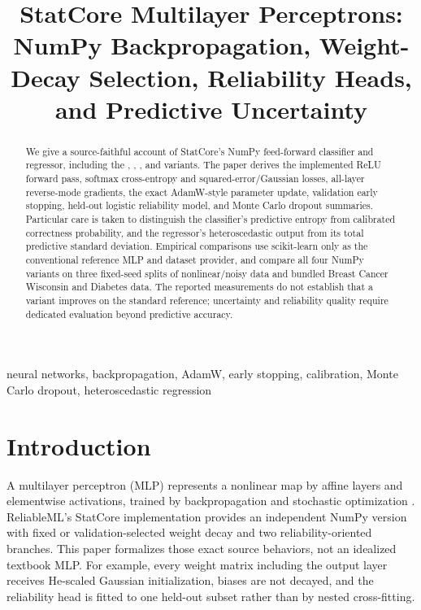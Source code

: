 \documentclass[conference]{IEEEtran}
\title{StatCore Multilayer Perceptrons: NumPy Backpropagation, Weight-Decay Selection, Reliability Heads, and Predictive Uncertainty}
\author{\jabulaniauthor \and \martinchanzauthor \and \oloratoauthor \and \mfundoauthor}
\begin{document}
\maketitle

\begin{abstract}
We give a source-faithful account of StatCore's NumPy feed-forward classifier and regressor, including the , , , and  variants. The paper derives the implemented ReLU forward pass, softmax cross-entropy and squared-error/Gaussian losses, all-layer reverse-mode gradients, the exact AdamW-style parameter update, validation early stopping, held-out logistic reliability model, and Monte Carlo dropout summaries. Particular care is taken to distinguish the classifier's predictive entropy from calibrated correctness probability, and the regressor's heteroscedastic output from its total predictive standard deviation. Empirical comparisons use scikit-learn only as the conventional reference MLP and dataset provider, and compare all four NumPy variants on three fixed-seed splits of nonlinear/noisy data and bundled Breast Cancer Wisconsin and Diabetes data. The reported measurements do not establish that a variant improves on the standard reference; uncertainty and reliability quality require dedicated evaluation beyond predictive accuracy.
\end{abstract}

\begin{IEEEkeywords}
neural networks, backpropagation, AdamW, early stopping, calibration, Monte Carlo dropout, heteroscedastic regression
\end{IEEEkeywords}

\section{Introduction}
A multilayer perceptron (MLP) represents a nonlinear map by affine layers and elementwise activations, trained by backpropagation and stochastic optimization \cite{rumelhart1986,he2015}. ReliableML's StatCore implementation provides an independent NumPy version with fixed or validation-selected weight decay and two reliability-oriented branches. This paper formalizes those exact source behaviors, not an idealized textbook MLP. For example, every weight matrix including the output layer receives He-scaled Gaussian initialization, biases are not decayed, and the reliability head is fitted to one held-out subset rather than by nested cross-fitting.
\end{document}
